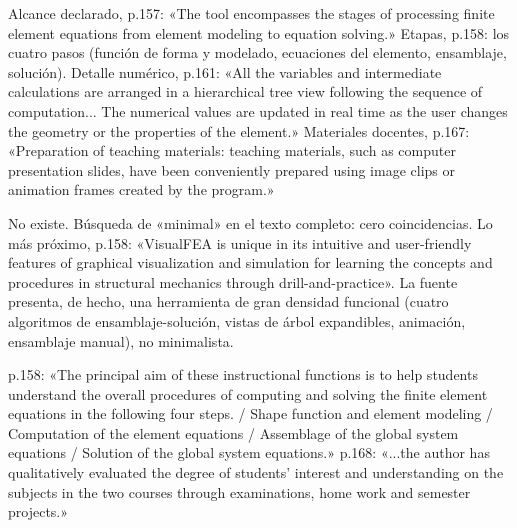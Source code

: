 \documentclass[11pt,a4paper]{article}
\newcommand{\campo}[1]{\textcolor{gris}{\footnotesize #1}}
\begin{document}
\vspace{3pt}\noindent{\small\textbf{p.\ 157, 158, 161, 167} \quad \campo{«En relación con las herramientas educativas reportadas en la literatura ---simuladores de armaduras, visualizadores de modos propios o entornos de procesamiento interactivo de ecuaciones del MEF---, la contribución distintiva de EduFEM es la cobertura integral del canal de cálculo ... articulada con una generación automática de...}}\par
\begin{pasaje}\footnotesize Alcance declarado, p.157: «The tool encompasses the stages of processing finite element equations from element modeling to equation solving.» Etapas, p.158: los cuatro pasos (función de forma y modelado, ecuaciones del elemento, ensamblaje, solución). Detalle numérico, p.161: «All the variables and intermediate calculations are arranged in a hierarchical tree view following the sequence of computation... The numerical values are updated in real time as the user changes the geometry or the properties of the element.» Materiales docentes, p.167: «Preparation of teaching materials: teaching materials, such as computer presentation slides, have been conveniently prepared using image clips or animation frames created by the program.»\end{pasaje}
\vspace{3pt}\noindent{\small\textbf{p.\ AUSENTE} \quad \campo{«...todo ello con una orientación deliberadamente minimalista coherente con su propósito didáctico» --- tesis/capitulos/05\_conclusiones.tex:15}}\par
\begin{pasaje}\footnotesize No existe. Búsqueda de «minimal» en el texto completo: cero coincidencias. Lo más próximo, p.158: «VisualFEA is unique in its intuitive and user-friendly features of graphical visualization and simulation for learning the concepts and procedures in structural mechanics through drill-and-practice». La fuente presenta, de hecho, una herramienta de gran densidad funcional (cuatro algoritmos de ensamblaje-solución, vistas de árbol expandibles, animación, ensamblaje manual), no minimalista.\end{pasaje}
\vspace{3pt}\noindent{\small\textbf{p.\ 158 y 168} \quad \campo{«los antecedentes revisados indican, en cambio, qué conceptos conviene poner a prueba» (en una futura validación pedagógica con estudiantes) --- tesis/capitulos/05\_conclusiones.tex:51}}\par
\begin{pasaje}\footnotesize p.158: «The principal aim of these instructional functions is to help students understand the overall procedures of computing and solving the finite element equations in the following four steps. / Shape function and element modeling / Computation of the element equations / Assemblage of the global system equations / Solution of the global system equations.» p.168: «...the author has qualitatively evaluated the degree of students' interest and understanding on the subjects in the two courses through examinations, home work and semester projects.»\end{pasaje}
\vspace{6pt}
\end{document}
